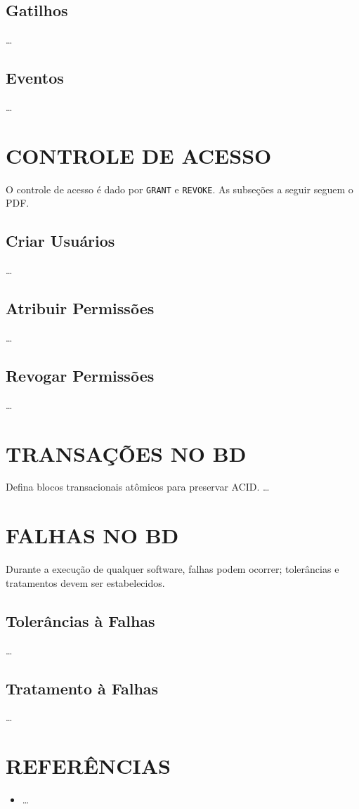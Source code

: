 \documentclass[
12pt,
a4paper,
semrecuonosumario,
sumario = abnt-6027-2012]{report}
\begin{document}
    \section{Gatilhos}
    \dots
    
    \section{Eventos}
    \dots

\chapter{CONTROLE DE ACESSO}\label{chap:acesso}
O controle de acesso é dado por \texttt{GRANT} e \texttt{REVOKE}. As subseções a seguir seguem o PDF.
    
    \section{Criar Usuários}
    \dots
    
    \section{Atribuir Permissões}
    \dots
    
    \section{Revogar Permissões}
    \dots
    
\chapter{TRANSAÇÕES NO BD}\label{chap:transacoes}
Defina blocos transacionais atômicos para preservar ACID.
\dots

\chapter{FALHAS NO BD}\label{chap:falhas}
Durante a execução de qualquer software, falhas podem ocorrer; tolerâncias e tratamentos devem ser estabelecidos.

    \section{Tolerâncias à Falhas}
    \dots
    
    \section{Tratamento à Falhas}
    \dots

\clearpage
\chapter*{REFERÊNCIAS}
\vspace{-0.5em}
\begin{itemize}
  \item \dots
\end{itemize}
\end{document}
